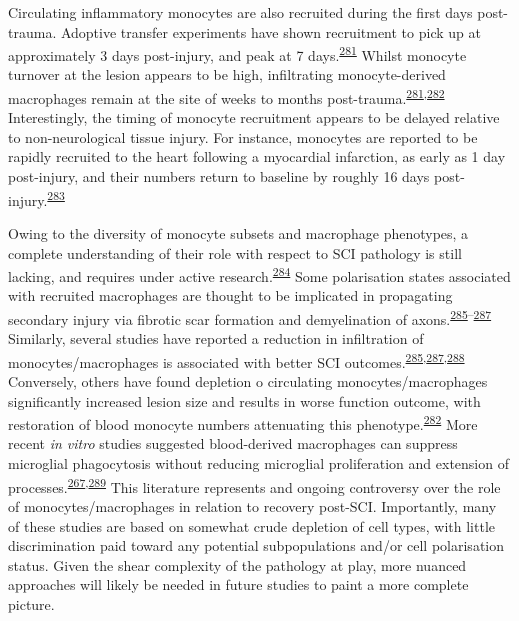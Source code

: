 \documentclass[
]{article}
\begin{document}
Circulating inflammatory monocytes are also recruited during the first days post-trauma.
Adoptive transfer experiments have shown recruitment to pick up at approximately 3 days post-injury, and peak at 7 days.\textsuperscript{\protect\hyperlink{ref-blomster_mobilisation_2013}{281}}
Whilst monocyte turnover at the lesion appears to be high, infiltrating monocyte-derived macrophages remain at the site of weeks to months post-trauma.\textsuperscript{\protect\hyperlink{ref-blomster_mobilisation_2013}{281},\protect\hyperlink{ref-shechter_infiltrating_2009}{282}}
Interestingly, the timing of monocyte recruitment appears to be delayed relative to non-neurological tissue injury.
For instance, monocytes are reported to be rapidly recruited to the heart following a myocardial infarction, as early as 1 day post-injury, and their numbers return to baseline by roughly 16 days post-injury.\textsuperscript{\protect\hyperlink{ref-nahrendorf_healing_2007}{283}}

Owing to the diversity of monocyte subsets and macrophage phenotypes, a complete understanding of their role with respect to SCI pathology is still lacking, and requires under active research.\textsuperscript{\protect\hyperlink{ref-david_repertoire_2011}{284}}
Some polarisation states associated with recruited macrophages are thought to be implicated in propagating secondary injury via fibrotic scar formation and demyelination of axons.\textsuperscript{\protect\hyperlink{ref-kigerl_identification_2009}{285}--\protect\hyperlink{ref-zhu_hematogenous_2015}{287}}
Similarly, several studies have reported a reduction in infiltration of monocytes/macrophages is associated with better SCI outcomes.\textsuperscript{\protect\hyperlink{ref-kigerl_identification_2009}{285},\protect\hyperlink{ref-zhu_hematogenous_2015}{287},\protect\hyperlink{ref-horn_another_2008}{288}}
Conversely, others have found depletion o circulating monocytes/macrophages significantly increased lesion size and results in worse function outcome, with restoration of blood monocyte numbers attenuating this phenotype.\textsuperscript{\protect\hyperlink{ref-shechter_infiltrating_2009}{282}}
More recent \emph{in vitro} studies suggested blood-derived macrophages can suppress microglial phagocytosis without reducing microglial proliferation and extension of processes.\textsuperscript{\protect\hyperlink{ref-greenhalgh_differences_2014}{267},\protect\hyperlink{ref-greenhalgh_peripherally_2018}{289}}
This literature represents and ongoing controversy over the role of monocytes/macrophages in relation to recovery post-SCI.
Importantly, many of these studies are based on somewhat crude depletion of cell types, with little discrimination paid toward any potential subpopulations and/or cell polarisation status.
Given the shear complexity of the pathology at play, more nuanced approaches will likely be needed in future studies to paint a more complete picture.
\end{document}
